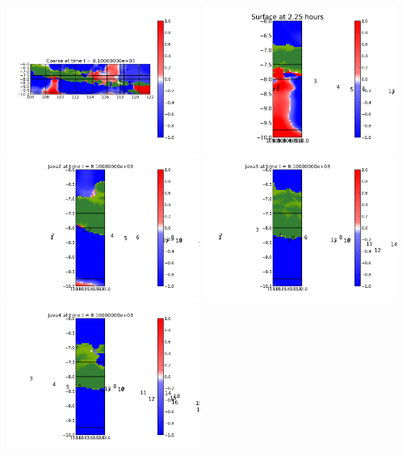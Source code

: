 \documentclass[11pt]{article}
\begin{document}
\vskip 10pt 
\includegraphics[width=0.475\textwidth]{frame0009fig0.png}
\includegraphics[width=0.475\textwidth]{frame0009fig15.png}
\vskip 10pt 
\includegraphics[width=0.475\textwidth]{frame0009fig25.png}
\includegraphics[width=0.475\textwidth]{frame0009fig20.png}
\vskip 10pt 
\includegraphics[width=0.475\textwidth]{frame0009fig30.png}
\end{document}
